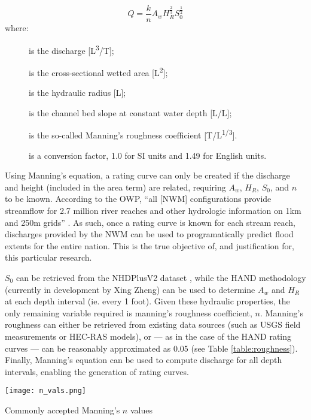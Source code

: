 \documentclass[12pt]{article}
\begin{document}
\begin{equation}
Q = \frac{k}{n}A_wH_R^\frac{2}{3}S_0^\frac{1}{2}
\end{equation}
where: 
\begin{description}
  \item[] is the discharge [L\textsuperscript{3}/T];
  \item[] is the cross-sectional wetted area [L\textsuperscript{2}];
  \item[] is the hydraulic radius [L];
  \item[] is the channel bed slope at constant water depth [L/L];
  \item[] is the so-called Manning's roughness coefficient [T/L\textsuperscript{1/3}]. 
  \item[] is a conversion factor, 1.0 for SI units and 1.49 for English units.
\end{description}

Using Manning's equation, a rating curve can only be created if the discharge and height (included in the area term) are related, requiring $A_w$, $H_R$, $S_0$, and $n$ to be known. According to the OWP, ``all [NWM] configurations provide streamflow for 2.7 million river reaches and other hydrologic information on 1km and 250m grids'' \cite{nwmsummary}. As such, once a rating curve is known for each stream reach, discharges provided by the NWM can be used to programatically predict flood extents for the entire nation. This is the true objective of, and justification for, this particular research. 

$S_0$ can be retrieved from the NHDPlusV2 dataset \cite{nhdplusv2}, while the HAND methodology (currently in development by Xing Zheng) can  be used to determine $A_w$ and $H_R$ at each depth interval (ie. every 1 foot). Given these hydraulic properties, the only remaining variable required is manning's roughness coefficient, $n$. Manning's roughness can either be retrieved from existing data sources (such as USGS field measurements or HEC-RAS models), or --- as in the case of the HAND rating curves --- can be reasonably approximated as 0.05 (see Table \ref{table:roughness}). Finally, Manning's equation can be used to compute discharge for all depth intervals, enabling the generation of rating curves. 

\begin{table}[H]
\centering
\texttt{[image: n\_vals.png]}
\caption{Commonly accepted Manning's $n$ values \cite{roughnesstable}}\label{table:roughness}
\end{table}
\end{document}
